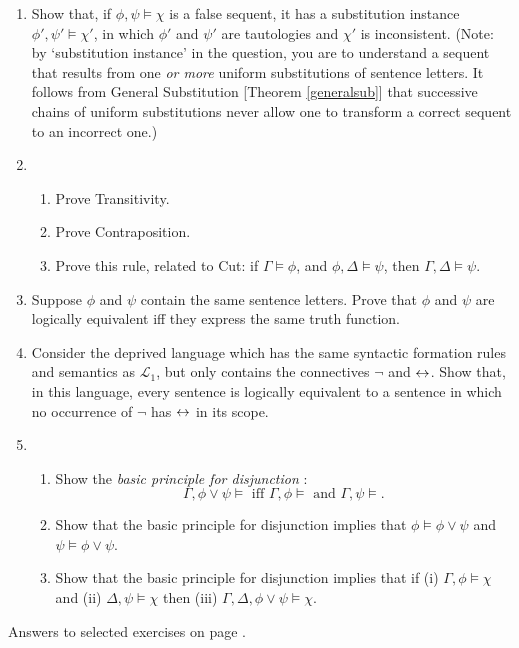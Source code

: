 {\begin{enumerate}
\item Show that, if $\phi,\psi \vDash \chi$ is a false sequent,
it has a substitution instance $\phi',\psi' \vDash \chi'$, in which 
$\phi'$ and $\psi'$ are tautologies and $\chi'$ is
inconsistent. (Note: by `substitution instance' in the question, you are to understand a sequent that results from one \emph{or more} uniform substitutions of sentence letters. It follows from General Substitution [Theorem \ref{generalsub}] that successive chains of uniform substitutions never allow one to transform a correct sequent to an incorrect one.)

\item \begin{enumerate}
	\item Prove Transitivity.
	\item Prove Contraposition.
	\item Prove this rule, related to Cut: if $\Gamma \vDash \phi$, and $\phi,\Delta \vDash \psi$, then $\Gamma,\Delta \vDash \psi$.
\end{enumerate} 

\item Suppose $\phi$ and $\psi$ contain the same sentence letters. Prove that $\phi$ and $\psi$ are logically equivalent iff they express the same truth function.

\item Consider the deprived language which has the same syntactic formation rules and semantics as $\mathcal{L}_{1}$, but only contains the connectives $\neg$ and $\leftrightarrow$. Show that, in this language, every sentence is logically equivalent to a sentence in which no occurrence of $\neg$ has $\leftrightarrow$ in its scope.



\item \begin{enumerate}
	\item Show the \emph{basic principle for disjunction} \citep[§2.5]{bosintlo}: $$\Gamma, \phi\vee\psi \vDash  \text{ iff } \Gamma,\phi \vDash \text{ and } \Gamma,\psi \vDash.$$
	\item Show that the basic principle for disjunction implies that $\phi \vDash \phi \vee \psi$ and $\psi \vDash \phi \vee \psi$.
	\item Show that the basic principle for disjunction implies that  if (i) $\Gamma, \phi \vDash  \chi$ and (ii) $\Delta, \psi \vDash \chi$ then (iii) $\Gamma,\Delta, \phi \vee \psi \vDash \chi$.
\end{enumerate}
\end{enumerate}

Answers to selected exercises on page \pageref{ans:l1semantics}.
}